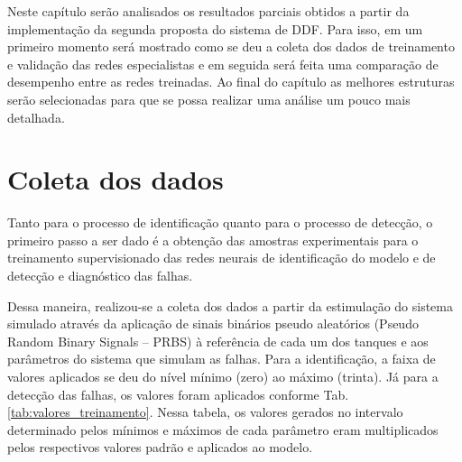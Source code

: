 \label{cap:resultados}

Neste capítulo serão analisados os resultados parciais obtidos a partir da
implementação da segunda proposta do sistema de DDF. Para isso, em um primeiro
momento será mostrado como se deu a coleta dos dados de treinamento e validação
das redes especialistas e em seguida será feita uma comparação de desempenho
entre as redes treinadas. Ao final do capítulo as melhores estruturas serão
selecionadas para que se possa realizar uma análise um pouco mais detalhada.

\section{Coleta dos dados}
Tanto para o processo de identificação quanto para o processo de detecção, o
primeiro passo a ser dado é a obtenção das amostras experimentais para o
treinamento supervisionado das redes neurais de identificação do modelo e de
detecção e diagnóstico das falhas.

Dessa maneira, realizou-se a coleta dos dados a partir da estimulação do sistema
simulado através da aplicação de sinais binários pseudo aleatórios ({Pseudo
Random Binary Signals} -- PRBS) à referência de cada um dos tanques e aos
parâmetros do sistema que simulam as falhas. Para a identificação, a faixa de
valores aplicados se deu do nível mínimo (zero) ao máximo (trinta). Já para a
detecção das falhas, os valores foram aplicados conforme Tab.
\ref{tab:valores_treinamento}. Nessa tabela, os valores gerados no
intervalo determinado pelos mínimos e máximos de cada parâmetro eram
multiplicados pelos respectivos valores padrão e aplicados ao modelo.

